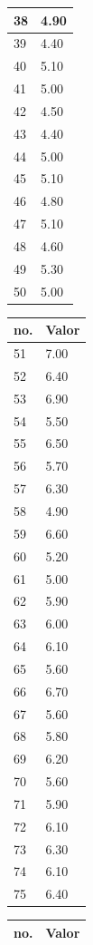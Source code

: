\begin{table}[!ht]
\begin{tabular}{ |l|l| }
38	&	4.90	\\ \hline
39	&	4.40	\\ \hline
40	&	5.10	\\ \hline
41	&	5.00	\\ \hline
42	&	4.50	\\ \hline
43	&	4.40	\\ \hline
44	&	5.00	\\ \hline
45	&	5.10	\\ \hline
46	&	4.80	\\ \hline
47	&	5.10	\\ \hline
48	&	4.60	\\ \hline
49	&	5.30	\\ \hline
50	&	5.00	\\ \hline
\end{tabular}
\begin{tabular}{ |l|l| }
\hline
 no. & Valor \\ \hline
51	&	7.00	\\ \hline
52	&	6.40	\\ \hline
53	&	6.90	\\ \hline
54	&	5.50	\\ \hline
55	&	6.50	\\ \hline
56	&	5.70	\\ \hline
57	&	6.30	\\ \hline
58	&	4.90	\\ \hline
59	&	6.60	\\ \hline
60	&	5.20	\\ \hline
61	&	5.00	\\ \hline
62	&	5.90	\\ \hline
63	&	6.00	\\ \hline
64	&	6.10	\\ \hline
65	&	5.60	\\ \hline
66	&	6.70	\\ \hline
67	&	5.60	\\ \hline
68	&	5.80	\\ \hline
69	&	6.20	\\ \hline
70	&	5.60	\\ \hline
71	&	5.90	\\ \hline
72	&	6.10	\\ \hline
73	&	6.30	\\ \hline
74	&	6.10	\\ \hline
75	&	6.40	\\ \hline
\end{tabular}
\begin{tabular}{ |l|l| }
\hline
 no. & Valor \\ \hline

\end{tabular}
\end{table}
